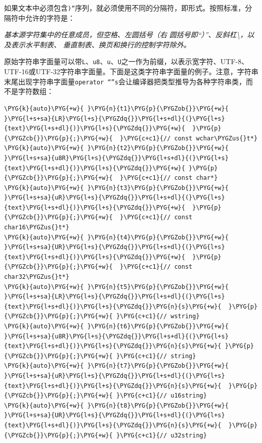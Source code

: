 
如果文本中必须包含\texttt{)\allowbreak{}“}序列，就必须使用不同的分隔符，即形式。按照标准，分隔符中允许的字符是：



\textit{基本源字符集中的任意成员，但空格、左圆括号（右} \textit{圆括号即“）”、反斜杠\textbackslash{}，以及表示水平制表、} \textit{垂直制表、换页和换行的控制字符除外。}



原始字符串字面量可以带\texttt{L}、\texttt{u8}、\texttt{u}、\texttt{U}之一作为前缀，以表示宽字符、UTF-8、UTF-16或UTF-32字符串字面量。下面是这类字符串字面量的例子。注意，字符串末尾出现字符串字面量\texttt{operator “”s}会让编译器把类型推导为各种字符串类，而不是字符数组：



\begin{codeblockbg}
\begin{Verbatim}[commandchars=\\\{\},breaklines=true,breakanywhere=true,fontsize=\codefont,xleftmargin=17bp]
\PYG{k}{auto}\PYG{+w}{ }\PYG{n}{t1}\PYG{p}{\PYGZob{}}\PYG{+w}{ }\PYG{l+s+sa}{LR}\PYG{l+s}{\PYGZdq{}}\PYG{l+s+dl}{(}\PYG{l+s}{text}\PYG{l+s+dl}{)}\PYG{l+s}{\PYGZdq{}}\PYG{+w}{  }\PYG{p}{\PYGZcb{}}\PYG{p}{;}\PYG{+w}{  }\PYG{c+c1}{// const wchar\PYGZus{}t*}
\PYG{k}{auto}\PYG{+w}{ }\PYG{n}{t2}\PYG{p}{\PYGZob{}}\PYG{+w}{ }\PYG{l+s+sa}{u8R}\PYG{l+s}{\PYGZdq{}}\PYG{l+s+dl}{(}\PYG{l+s}{text}\PYG{l+s+dl}{)}\PYG{l+s}{\PYGZdq{}}\PYG{+w}{ }\PYG{p}{\PYGZcb{}}\PYG{p}{;}\PYG{+w}{  }\PYG{c+c1}{// const char*}
\PYG{k}{auto}\PYG{+w}{ }\PYG{n}{t3}\PYG{p}{\PYGZob{}}\PYG{+w}{ }\PYG{l+s+sa}{uR}\PYG{l+s}{\PYGZdq{}}\PYG{l+s+dl}{(}\PYG{l+s}{text}\PYG{l+s+dl}{)}\PYG{l+s}{\PYGZdq{}}\PYG{+w}{  }\PYG{p}{\PYGZcb{}}\PYG{p}{;}\PYG{+w}{  }\PYG{c+c1}{// const char16\PYGZus{}t*}
\PYG{k}{auto}\PYG{+w}{ }\PYG{n}{t4}\PYG{p}{\PYGZob{}}\PYG{+w}{ }\PYG{l+s+sa}{UR}\PYG{l+s}{\PYGZdq{}}\PYG{l+s+dl}{(}\PYG{l+s}{text}\PYG{l+s+dl}{)}\PYG{l+s}{\PYGZdq{}}\PYG{+w}{  }\PYG{p}{\PYGZcb{}}\PYG{p}{;}\PYG{+w}{  }\PYG{c+c1}{// const char32\PYGZus{}t*}
\PYG{k}{auto}\PYG{+w}{ }\PYG{n}{t5}\PYG{p}{\PYGZob{}}\PYG{+w}{ }\PYG{l+s+sa}{LR}\PYG{l+s}{\PYGZdq{}}\PYG{l+s+dl}{(}\PYG{l+s}{text}\PYG{l+s+dl}{)}\PYG{l+s}{\PYGZdq{}}\PYG{n}{s}\PYG{+w}{  }\PYG{p}{\PYGZcb{}}\PYG{p}{;}\PYG{+w}{ }\PYG{c+c1}{// wstring}
\PYG{k}{auto}\PYG{+w}{ }\PYG{n}{t6}\PYG{p}{\PYGZob{}}\PYG{+w}{ }\PYG{l+s+sa}{u8R}\PYG{l+s}{\PYGZdq{}}\PYG{l+s+dl}{(}\PYG{l+s}{text}\PYG{l+s+dl}{)}\PYG{l+s}{\PYGZdq{}}\PYG{n}{s}\PYG{+w}{ }\PYG{p}{\PYGZcb{}}\PYG{p}{;}\PYG{+w}{ }\PYG{c+c1}{// string}
\PYG{k}{auto}\PYG{+w}{ }\PYG{n}{t7}\PYG{p}{\PYGZob{}}\PYG{+w}{ }\PYG{l+s+sa}{uR}\PYG{l+s}{\PYGZdq{}}\PYG{l+s+dl}{(}\PYG{l+s}{text}\PYG{l+s+dl}{)}\PYG{l+s}{\PYGZdq{}}\PYG{n}{s}\PYG{+w}{  }\PYG{p}{\PYGZcb{}}\PYG{p}{;}\PYG{+w}{ }\PYG{c+c1}{// u16string}
\PYG{k}{auto}\PYG{+w}{ }\PYG{n}{t8}\PYG{p}{\PYGZob{}}\PYG{+w}{ }\PYG{l+s+sa}{UR}\PYG{l+s}{\PYGZdq{}}\PYG{l+s+dl}{(}\PYG{l+s}{text}\PYG{l+s+dl}{)}\PYG{l+s}{\PYGZdq{}}\PYG{n}{s}\PYG{+w}{  }\PYG{p}{\PYGZcb{}}\PYG{p}{;}\PYG{+w}{ }\PYG{c+c1}{// u32string}
\end{Verbatim}
\end{codeblockbg}


